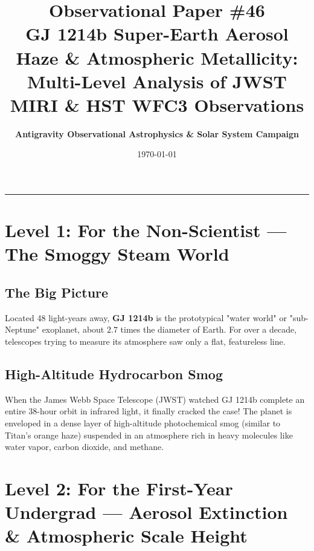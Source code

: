 \documentclass[11pt,a4paper]{article}
\title{\Huge \textbf{Observational Paper \#46}\\ \Large GJ 1214b Super-Earth Aerosol Haze \& Atmospheric Metallicity: Multi-Level Analysis of JWST MIRI \& HST WFC3 Observations}
\author{\textbf{Antigravity Observational Astrophysics \& Solar System Campaign}}
\date{\today}
\begin{document}
\maketitle

\vspace{-1em}
\begin{center}
\rule{\textwidth}{1.5pt}
\end{center}

\section*{Level 1: For the Non-Scientist — The Smoggy Steam World}

\subsection*{The Big Picture}
Located 48 light-years away, \textbf{GJ 1214b} is the prototypical "water world" or "sub-Neptune" exoplanet, about $2.7$ times the diameter of Earth. For over a decade, telescopes trying to measure its atmosphere saw only a flat, featureless line.

\subsection*{High-Altitude Hydrocarbon Smog}
When the James Webb Space Telescope (JWST) watched GJ 1214b complete an entire 38-hour orbit in infrared light, it finally cracked the case! The planet is enveloped in a dense layer of high-altitude photochemical smog (similar to Titan's orange haze) suspended in an atmosphere rich in heavy molecules like water vapor, carbon dioxide, and methane.

\newpage

\section*{Level 2: For the First-Year Undergrad — Aerosol Extinction \& Atmospheric Scale Height}
\end{document}
